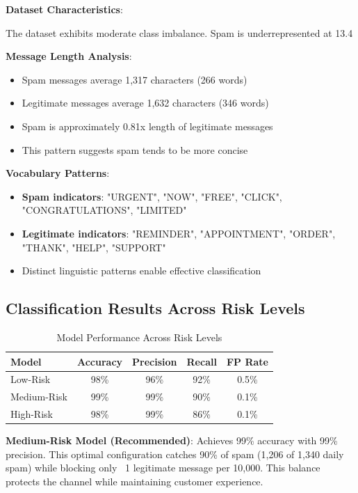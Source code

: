 \documentclass[12pt,a4paper]{article}
\begin{document}
\textbf{Dataset Characteristics}:

The dataset exhibits moderate class imbalance. Spam is underrepresented at 13.4%

\textbf{Message Length Analysis}:
\begin{itemize}
    \item Spam messages average 1,317 characters (266 words)
    \item Legitimate messages average 1,632 characters (346 words)
    \item Spam is approximately 0.81x length of legitimate messages
    \item This pattern suggests spam tends to be more concise
\end{itemize}

\textbf{Vocabulary Patterns}:
\begin{itemize}
    \item \textbf{Spam indicators}: "URGENT", "NOW", "FREE", "CLICK", "CONGRATULATIONS", "LIMITED"
    \item \textbf{Legitimate indicators}: "REMINDER", "APPOINTMENT", "ORDER", "THANK", "HELP", "SUPPORT"
    \item Distinct linguistic patterns enable effective classification
\end{itemize}

\subsection{Classification Results Across Risk Levels}

\begin{table}[H]
\centering
\begin{tabular}{@{}lcccc@{}}
\toprule
\textbf{Model} & \textbf{Accuracy} & \textbf{Precision} & \textbf{Recall} & \textbf{FP Rate} \\
\midrule
Low-Risk & 98\% & 96\% & 92\% & 0.5\% \\
Medium-Risk & 99\% & 99\% & 90\% & 0.1\% \\
High-Risk & 98\% & 99\% & 86\% & 0.1\% \\
\bottomrule
\end{tabular}
\caption{Model Performance Across Risk Levels}
\end{table}

\textbf{Medium-Risk Model (Recommended)}: Achieves 99\% accuracy with 99\% precision. This optimal configuration catches 90\% of spam (1,206 of 1,340 daily spam) while blocking only ~1 legitimate message per 10,000. This balance protects the channel while maintaining customer experience.
\end{document}
